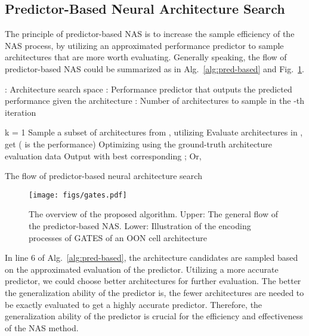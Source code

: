 \documentclass[runningheads]{llncs}
\begin{document}
\subsection{Predictor-Based Neural Architecture Search}
\label{sec:pb-nas}

The principle of predictor-based NAS is to increase the sample efficiency of the NAS process, by utilizing an approximated performance predictor to sample architectures that are more worth evaluating.
Generally speaking, the flow of predictor-based NAS could be summarized as in Alg.~\ref{alg:pred-based} and Fig.~\ref{fig:gates}.

\begin{algorithm}[bt]
\begin{algorithmic}[1]
\STATE : Architecture search space
\STATE : Performance predictor that outputs the predicted performance given the architecture
\STATE : Number of architectures to sample in the -th iteration
\item[]
\STATE k = 1
\STATE Sample a subset of architectures  from , utilizing 
\STATE Evaluate architectures in , get  ( is the performance)
\STATE Optimizing  using the ground-truth architecture evaluation data 
\ENDWHILE
\STATE Output  with best corresponding ; Or, 
\end{algorithmic}
\caption{The flow of predictor-based neural architecture search}
\label{alg:pred-based}
\end{algorithm}


\begin{figure}[tb]
  \begin{center}
    \texttt{[image: figs/gates.pdf]}
    \caption{The overview of the proposed algorithm. Upper: The general flow of the predictor-based NAS. Lower: Illustration of the encoding processes of GATES of an OON cell architecture}
    \label{fig:gates}
  \end{center}

\end{figure}


In line 6 of Alg.~\ref{alg:pred-based}, the architecture candidates are sampled based on the approximated evaluation of the predictor.
Utilizing a more accurate predictor, we could choose better architectures for further evaluation.
The better the generalization ability of the predictor is, the fewer architectures are needed to be exactly evaluated to get a highly accurate
predictor. Therefore, the generalization ability of the predictor is crucial for the efficiency and effectiveness of the NAS method.
\end{document}

